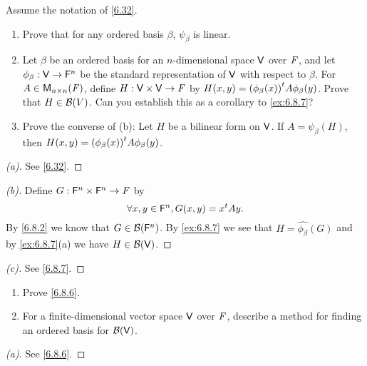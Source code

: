 \begin{ex}\label{ex:6.8.8}
  Assume the notation of \cref{6.32}.
  \begin{enumerate}
    \item Prove that for any ordered basis \(\beta\), \(\psi_{\beta}\) is linear.
    \item Let \(\beta\) be an ordered basis for an \(n\)-dimensional space \(\mathsf{V}\) over \(\mathit{F}\), and let \(\phi_{\beta} : \mathsf{V} \to \mathsf{F}^n\) be the standard representation of \(\mathsf{V}\) with respect to \(\beta\).
          For \(A \in \ms[n][n][\F]\), define \(H : \mathsf{V} \times \mathsf{V} \to \mathit{F}\) by \(H(x, y) = {(\phi_{\beta}(x))}^{t} A \phi_{\beta}(y)\).
          Prove that \(H \in \mathcal{B}(V)\).
          Can you establish this as a corollary to \cref{ex:6.8.7}?
    \item Prove the converse of (b):
          Let \(H\) be a bilinear form on \(\mathsf{V}\).
          If \(A = \psi_{\beta}(H)\), then \(H(x, y) = {(\phi_{\beta}(x))}^{t} A \phi_{\beta}(y)\).
  \end{enumerate}
\end{ex}

\begin{proof}[(a)]
  See \cref{6.32}.
\end{proof}

\begin{proof}[(b)]
  Define \(G : \mathsf{F}^n \times \mathsf{F}^n \to \mathit{F}\) by
  \[
    \forall x, y \in \mathsf{F}^n, G(x, y) = {x}^{t} A y.
  \]
  By \cref{6.8.2} we know that \(G \in \mathcal{B}(\mathsf{F}^n)\).
  By \cref{ex:6.8.7} we see that \(H = \widehat{\phi_{\beta}}(G)\) and by \cref{ex:6.8.7}(a) we have \(H \in \mathcal{B}(\mathsf{V})\).
\end{proof}

\begin{proof}[(c)]
  See \cref{6.8.7}.
\end{proof}

\begin{ex}\label{ex:6.8.9}
  \begin{enumerate}
    \item Prove \cref{6.8.6}.
    \item For a finite-dimensional vector space \(\mathsf{V}\) over \(\mathit{F}\), describe a method for finding an ordered basis for \(\mathcal{B}(\mathsf{V})\).
  \end{enumerate}
\end{ex}

\begin{proof}[(a)]
  See \cref{6.8.6}.
\end{proof}


